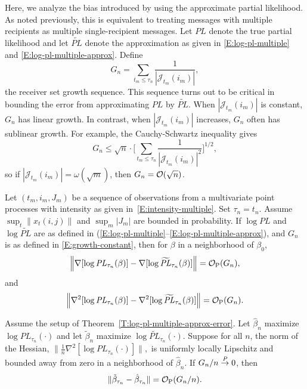 \documentclass[aoas,preprint]{imsart}
\begin{document}
Here, we analyze the bias introduced by using the approximate partial
likelihood.  As noted previously, this is equivalent to treating messages with
multiple recipients as multiple single-recipient messages.  Let
$\mathit{PL}$ denote the true partial likelihood and let $\widetilde{\mathit{PL}}$
denote the approximation as given in \eqref{E:log-pl-multiple}
and \eqref{E:log-pl-multiple-approx}.  Define
\begin{equation}\label{E:growth-constant}
    G_n
        =
            \sum_{t_m \leq \tau_n}
                \frac{1}{|\mathcal{J}_{t_m}(i_m)|},
\end{equation}
the receiver set growth sequence.  This sequence turns out to be critical
in bounding the error from approximating $\mathit{PL}$ by
$\widetilde{\mathit{PL}}.$  When $|\mathcal{J}_{t_m}(i_m)|$ is
constant, $G_n$ has linear growth.  In contrast, when
$|\mathcal{J}_{t_m}(i_m)|$ increases, $G_n$ often has sublinear growth.
For example, the Cauchy-Schwartz inequality gives
\[
    G_n
        \leq
            \sqrt{n}
            \cdot
            \bigg[
                \sum_{t_m \leq \tau_n}
                    \frac{1}{|\mathcal{J}_{t_m}(i_m)|^2}
            \bigg]^{1/2},
\]
so if $|\mathcal{J}_{t_m}(i_m)| = \omega(\sqrt{m})$, then
$G_n = \mathcal{O}(\sqrt{n})$.

\begin{theorem}\label{T:log-pl-multiple-approx-error}
    Let $(t_m, i_m, J_m)$ be a sequence of observations from a multivariate
    point processes with intensity as given in~\eqref{E:intensity-multiple}.
    Set $\tau_n = t_n$.  Assume
    \(
        \sup_t \| x_t (i,j) \|
    \)
    and
    \(
        \sup_m | J_m |
    \)
    are bounded in probability.  
    If $\log \mathit{PL}$ and $\log \widetilde{\mathit{PL}}$ are as
    defined in
    \textnormal{(}\ref{E:log-pl-multiple}--\ref{E:log-pl-multiple-approx}\textnormal{)},
    and $G_n$ is as defined in \eqref{E:growth-constant},
    then for $\beta$ in a neighborhood of $\beta_0$,
    \[
        \Big\|
        \nabla [\log \mathit{PL}_{\tau_n}(\beta) ]
        -
        \nabla [\log \widetilde{\mathit{PL}}_{\tau_n}(\beta) ]
        \Big\|
            =
            \mathcal{O}_\text{P}(G_n),
    \]
    and
    \[
        \Big\|
        \nabla^2 [\log \mathit{PL}_{\tau_n}(\beta) ]
        -
        \nabla^2 [\log \widetilde{\mathit{PL}}_{\tau_n}(\beta) ]
        \Big\|
            =
            \mathcal{O}_\text{P}(G_n).
    \]
\end{theorem}
\begin{corollary}\label{C:mple-approx-error}
    Assume the setup of Theorem~\ref{T:log-pl-multiple-approx-error}.
    Let $\hat \beta_n$ maximize $\log \mathit{PL}_{\tau_n}(\cdot)$
    and let $\tilde \beta_n$ maximize
    $\log \widetilde{\mathit{PL}}_{\tau_n}(\cdot)$. 
    Suppose for all $n$, the norm of the Hessian,
    \(
        \|
        \tfrac{1}{n}
        \nabla^2
        [ \log \mathit{PL}_{\tau_n}(\cdot)]
        \|,
    \)
    is uniformly locally Lipschitz and bounded away from zero
    in a neighborhood of $\hat \beta_n$.
    If $G_n/n \overset{\mathit{P}}{\to} 0$, then
    \[
        \| \tilde \beta_{\tau_n} - \hat \beta_{\tau_n} \|
            =
            \mathcal{O}_\text{P}(G_n/n).
    \]
\end{corollary}
\end{document}
